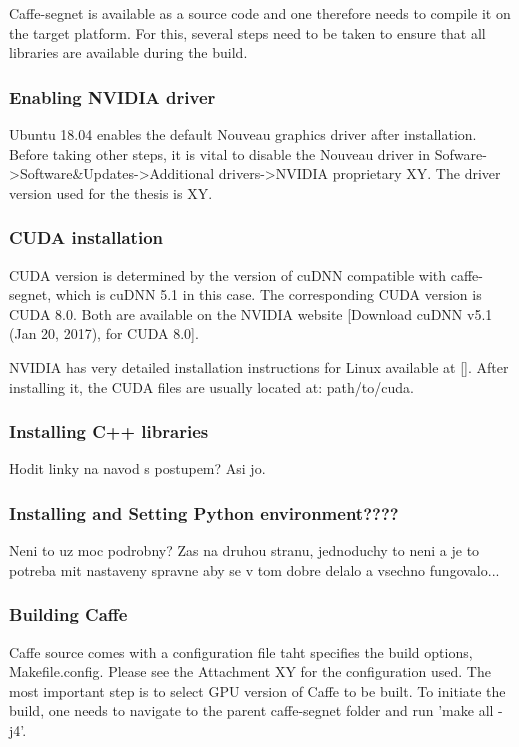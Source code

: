 Caffe-segnet is available as a source code and one therefore needs to compile it on the target platform. For this, several steps need to be taken to ensure that all libraries are available during the build.

\subsubsection{Enabling NVIDIA driver}

Ubuntu 18.04 enables the default Nouveau graphics driver after installation. Before taking other steps, it is vital to disable the Nouveau driver in Sofware->Software\&Updates->Additional drivers->NVIDIA proprietary XY. The driver version used for the thesis is XY.

\subsubsection{CUDA installation}

CUDA version is determined by the version of cuDNN compatible with caffe-segnet, which is cuDNN 5.1 in this case. The corresponding CUDA version is CUDA 8.0. Both are available on the NVIDIA website [Download cuDNN v5.1 (Jan 20, 2017), for CUDA 8.0]. 

NVIDIA has very detailed installation instructions for Linux available at []. After installing it, the CUDA files are usually located at: path/to/cuda.

\subsubsection{Installing C++ libraries}

Hodit linky na navod s postupem? Asi jo.

\subsubsection{Installing and Setting Python environment????}

Neni to uz moc podrobny? Zas na druhou stranu, jednoduchy to neni a je to potreba mit nastaveny spravne aby se v tom dobre delalo a vsechno fungovalo...

\subsubsection{Building Caffe}

Caffe source comes with a configuration file taht specifies the build options, Makefile.config. Please see the Attachment XY for the configuration used. The most important step is to select GPU version of Caffe to be built. To initiate the build, one needs to navigate to the parent caffe-segnet folder and run 'make all -j4'.

